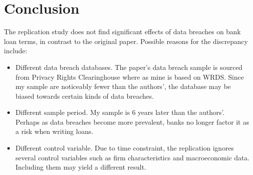 \documentclass[11pt]{article}
\begin{document}
\section{Conclusion}
The replication study does not find significant effects of data breaches on bank loan terms, in contrast to the original paper. Possible reasons for the discrepancy include: \begin{itemize}
  \item Different data breach databases. The paper's data breach sample is sourced from Privacy Rights Clearinghouse where as mine is based on WRDS. Since my sample are noticeably fewer than the authors', the database may be biased towards certain kinds of data breaches.
  \item Different sample period. My sample is 6 years later than the authors'. Perhaps as data breaches become more prevalent, banks no longer factor it as a risk when writing loans.
  \item Different control variable. Due to time constraint, the replication ignores several control variables such as firm characteristics and macroeconomic data. Including them may yield a different result.
\end{itemize}
\end{document}
